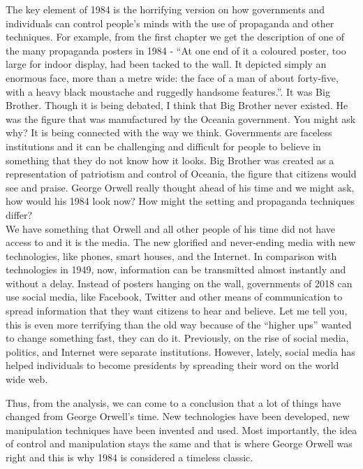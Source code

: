 \documentclass[a4paper,12pt]{article}
\begin{document}
The key element of 1984 is the horrifying version on how governments and individuals can control people's minds with the use of propaganda and other techniques. For example, from the first chapter we get the description of one of the many propaganda posters in 1984 - ``At one end of it a coloured poster, too large for indoor display, had been tacked to the wall. It depicted simply an enormous face, more than a metre wide: the face of a man of about forty-five, with a heavy black moustache and ruggedly handsome features.''. It was Big Brother. Though it is being debated, I think that Big Brother never existed. He was the figure that was manufactured by the Oceania government. You might ask why? It is being connected with the way we think. Governments are faceless institutions and it can be challenging and difficult for people to believe in something that they do not know how it looks. Big Brother was created as a representation of patriotism and control of Oceania, the figure that citizens would see and praise. George Orwell really thought ahead of his time and we might ask, how would his 1984 look now? How might the setting and propaganda techniques differ?\\

We have something that Orwell and all other people of his time did not have access to and it is the media. The new glorified and never-ending media with new technologies, like phones, smart houses, and the Internet. In comparison with technologies in 1949, now, information can be transmitted almost instantly and without a delay. Instead of posters hanging on the wall, governments of 2018 can use social media, like Facebook, Twitter and other means of communication to spread information that they want citizens to hear and believe. Let me tell you, this is even more terrifying than the old way because of the ``higher ups'' wanted to change something fast, they can do it. Previously, on the rise of social media, politics, and Internet were separate institutions. However, lately, social media has helped individuals to become presidents by spreading their word on the world wide web.

Thus, from the analysis, we can come to a conclusion that a lot of things have changed from George Orwell's time. New technologies have been developed, new manipulation techniques have been invented and used. Most importantly, the idea of control and manipulation stays the same and that is where George Orwell was right and this is why 1984 is considered a timeless classic.

%
%
\end{document}
